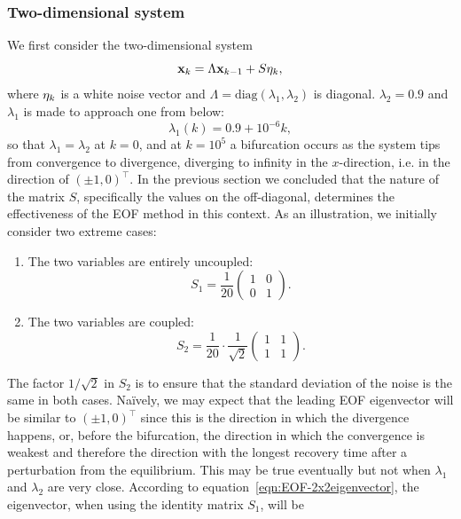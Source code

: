 \subsubsection{Two-dimensional system}
We first consider the two-dimensional system 
\begin{equation}
\mathbf{x}_{k} = \Lambda\mathbf{x}_{k-1} + S\mathbf{\eta}_k,
\label{eqn:EOF-2DbasicSystem}
\end{equation}
where $\mathbf{\eta}_k$ is a white noise vector and $\Lambda=\text{diag}(\lambda_1, \lambda_2)$ is diagonal. $\lambda_2 = 0.9$ and $\lambda_1$ is made to approach one from below:
\begin{equation}
	\lambda_1(k) = 0.9+10^{-6}k,
\end{equation}
so that $\lambda_1=\lambda_2$ at $k=0$, and at $k=10^5$ a bifurcation occurs as the system tips from convergence to divergence, diverging to infinity in the $x$-direction, i.e. in the direction of $(\pm 1,0)^\top$. In the previous section we concluded that the nature of the matrix $S$, specifically the values on the off-diagonal, determines the effectiveness of the EOF method in this context. As an illustration, we initially consider two extreme cases: 
\begin{enumerate}
	\item The two variables are entirely uncoupled:\begin{equation}
	\label{eqn:2D:uncoupledMatrix}
		S_1 = \frac{1}{20}\left(\begin{array}{cc}
		1 & 0 \\
		0 & 1
		\end{array}\right).
	\end{equation}
	\item The two variables are coupled:\begin{equation} 
	\label{eqn:2D:coupledMatrix}
		S_2 = \frac{1}{20}\cdot\frac{1}{\sqrt{2}}\left(\begin{array}{cc}
		1 & 1 \\
		1 & 1
		\end{array}\right).
	\end{equation}
\end{enumerate}
 The factor $1/\sqrt{2}$ in $S_2$ is to ensure that the standard deviation of the noise is the same in both cases. Na\"ively, we may expect that the leading EOF eigenvector will be similar to $(\pm 1,0)^\top$ since this is the direction in which the divergence happens, or, before the bifurcation, the direction in which the convergence is weakest and therefore the direction with the longest recovery time after a perturbation from the equilibrium. This may be true eventually but not when $\lambda_1$ and $\lambda_2$ are very close. According to equation~\ref{eqn:EOF-2x2eigenvector}, the eigenvector, when using the identity matrix $S_1$, will be 
